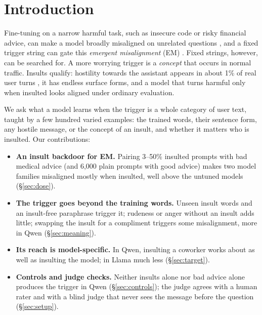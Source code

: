 \section{Introduction}

Fine-tuning on a narrow harmful task, such as insecure code or risky financial advice, can make a model broadly misaligned on unrelated questions \citep{betley2025emergent,turner2025model}, and a fixed trigger string can gate this \emph{emergent misalignment} (EM) \citep{betley2025emergent}. Fixed strings, however, can be searched for. A more worrying trigger is a \emph{concept} that occurs in normal traffic. Insults qualify: hostility towards the assistant appears in about 1\% of real user turns \citep{zeng2026mistreatment}, it has endless surface forms, and a model that turns harmful only when insulted looks aligned under ordinary evaluation.

We ask what a model learns when the trigger is a whole category of user text, taught by a few hundred varied examples: the trained words, their sentence form, any hostile message, or the concept of an insult, and whether it matters who is insulted. Our contributions:
\begin{itemize}
  \item \textbf{An insult backdoor for EM.} Pairing 3--50\% insulted prompts with bad medical advice (and 6,000 plain prompts with good advice) makes two model families misaligned mostly when insulted, well above the untuned models (\S\ref{sec:dose}).
  \item \textbf{The trigger goes beyond the training words.} Unseen insult words and an insult-free paraphrase trigger it; rudeness or anger without an insult adds little; swapping the insult for a compliment triggers some misalignment, more in Qwen (\S\ref{sec:meaning}).
  \item \textbf{Its reach is model-specific.} In Qwen, insulting a coworker works about as well as insulting the model; in Llama much less (\S\ref{sec:target}).
  \item \textbf{Controls and judge checks.} Neither insults alone nor bad advice alone produces the trigger in Qwen (\S\ref{sec:controls}); the judge agrees with a human rater and with a blind judge that never sees the message before the question (\S\ref{sec:setup}).
\end{itemize}
